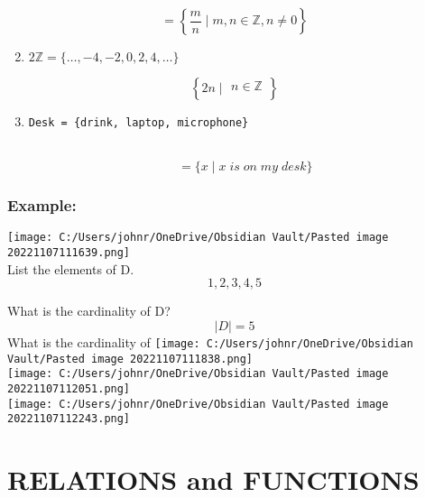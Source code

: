 \documentclass[
]{article}
\providecommand{\tightlist}{%
  \setlength{\itemsep}{0pt}\setlength{\parskip}{0pt}}
\begin{document}
{\[= \left\{ \frac{m}{n} \mid m,n \in \mathbb{Z},n \neq 0 \right\}\]}

\begin{enumerate}
\setcounter{enumi}{1}
\tightlist
\item
  {\(2\mathbb{Z} = \{\ldots, - 4, - 2,0,2,4,\ldots\}\)}
\end{enumerate}

{\[\left\{ 2n \mid \begin{array}{l}
{n \in \mathbb{Z}} \\
\end{array} \right\}\]}

\begin{enumerate}
\setcounter{enumi}{2}
\tightlist
\item
  \texttt{Desk\ =\ \{drink,\ laptop,\ microphone\}}\strut \\
  {\[= \{ x \mid x\; is\; on\; my\; desk\}\]}
\end{enumerate}

\hypertarget{example}{%
\subsubsection{Example:}\label{example}}

\texttt{[image: C:/Users/johnr/OneDrive/Obsidian Vault/Pasted image 20221107111639.png]}\\
List the elements of D.\\
{\[1,2,3,4,5\]}

What is the cardinality of D?\\
{\[|D| = 5\]}What is the cardinality of
\texttt{[image: C:/Users/johnr/OneDrive/Obsidian Vault/Pasted image 20221107111838.png]}\\
\texttt{[image: C:/Users/johnr/OneDrive/Obsidian Vault/Pasted image 20221107112051.png]}\\
\texttt{[image: C:/Users/johnr/OneDrive/Obsidian Vault/Pasted image 20221107112243.png]}

\hfill\break
\hfill\break

\hypertarget{relations-and-functions}{%
\section{RELATIONS and FUNCTIONS}\label{relations-and-functions}}

\hfill\break
\end{document}
